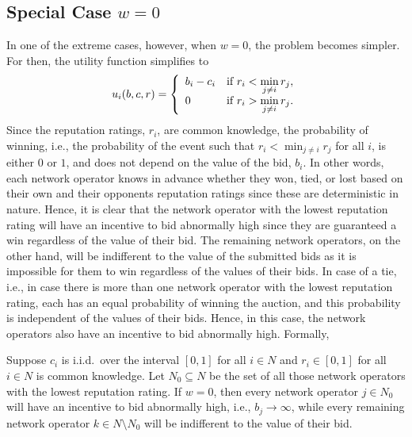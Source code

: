 \subsection{Special Case $w=0$} %
\label{sub:special_case_w_0_direct}
In one of the extreme cases, however, when $w=0$, the problem becomes simpler. For then, the utility function simplifies to
\begin{equation}
	\label{eq:utility_w_0_direct}
	u_i(b,c,r) = \left\{
	\begin{array}{l l}
		b_i-c_i &\text{if } r_i < \displaystyle\min_{j\neq i} r_j,\\
		0 &\text{if } r_i > \displaystyle\min_{j\neq i} r_j.
	\end{array}\right.
\end{equation}
Since the reputation ratings, $r_i$, are common knowledge, the probability of winning, i.e., the probability of the event such that $r_i<\min_{j\neq i}r_j$ for all $i$, is either $0$ or $1$, and does not depend on the value of the bid, $b_i$. In other words, each network operator knows in advance whether they won, tied, or lost based on their own and their opponents reputation ratings since these are deterministic in nature. Hence, it is clear that the network operator with the lowest reputation rating will have an incentive to bid abnormally high since they are guaranteed a win regardless of the value of their bid. The remaining network operators, on the other hand, will be indifferent to the value of the submitted bids as it is impossible for them to win regardless of the values of their bids. In case of a tie, i.e., in case there is more than one network operator with the lowest reputation rating, each has an equal probability of winning the auction, and this probability is independent of the values of their bids. Hence, in this case, the network operators also have an incentive to bid abnormally high. Formally,
\begin{proposition}
\label{prop:special_case_w_0_direct}
Suppose $c_i$ is i.i.d.~over the interval $[0,1]$ for all $i\in N$ and $r_i\in [0,1]$ for all $i\in N$ is common knowledge. Let $N_0\subseteq N$ be the set of all those network operators with the lowest reputation rating. If $w=0$, then every network operator $j\in N_0$ will have an incentive to bid abnormally high, i.e., $b_j\rightarrow\infty$, while every remaining network operator $k\in N\setminus N_0$ will be indifferent to the value of their bid.
\end{proposition}

